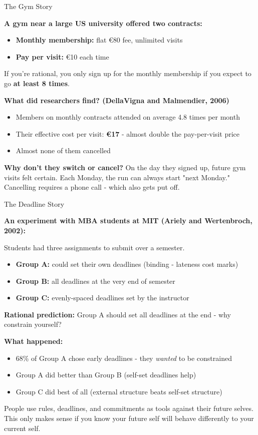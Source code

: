 \documentclass[10pt]{beamer}
\begin{document}
\begin{frame}{The Gym Story}

\textbf{A gym near a large US university offered two contracts:}
\begin{itemize}
\item \textbf{Monthly membership:} flat \euro 80 fee, unlimited visits
\item \textbf{Pay per visit:} \euro 10 each time
\end{itemize}


If you're rational, you only sign up for the monthly membership if you expect to go \textbf{at least 8 times}.


\textbf{What did researchers find? (DellaVigna and Malmendier, 2006)}
\begin{itemize}
\item Members on monthly contracts attended on average \alert{4.8 times per month}
\item Their effective cost per visit: \textbf{\euro 17} - almost double the pay-per-visit price
\item Almost none of them cancelled
\end{itemize}


\textbf{Why don't they switch or cancel?}
On the day they signed up, future gym visits felt certain.
Each Monday, the run can always start "next Monday."
Cancelling requires a phone call - \alert{which also gets put off}.
\end{frame}


\begin{frame}[allowframebreaks]{The Deadline Story}

\textbf{An experiment with MBA students at MIT (Ariely and Wertenbroch, 2002):}


Students had three assignments to submit over a semester.
\begin{itemize}
\item \textbf{Group A:} could set their own deadlines (binding - lateness cost marks)
\item \textbf{Group B:} all deadlines at the very end of semester
\item \textbf{Group C:} evenly-spaced deadlines set by the instructor
\end{itemize}


\textbf{Rational prediction:} Group A should set all deadlines at the end - why constrain yourself?


\textbf{What happened:}
\begin{itemize}
\item 68\% of Group A chose early deadlines - they \emph{wanted} to be constrained
\item Group A did better than Group B (self-set deadlines help)
\item Group C did best of all (external structure beats self-set structure)
\end{itemize}


\alert{People use rules, deadlines, and commitments as tools against their future selves.}
This only makes sense if you know your future self will behave differently to your current self.
\end{frame}
\end{document}
